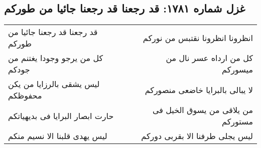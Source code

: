 \begin{center}
\section*{غزل شماره ۱۷۸۱: قد رجعنا قد رجعنا جائیا من طورکم}
\label{sec:1781}
\begin{longtable}{l p{0.5cm} r}
قد رجعنا قد رجعنا جائیا من طورکم
&&
انظرونا انظرونا نقتبس من نورکم
\\
کل من یرجو وجودا یغتنم من جودکم
&&
کل من ارداه عسر نال من میسورکم
\\
لیس یشقی بالرزایا من یکن محفوظکم
&&
لا یبالی بالبرایا خاضعی منصورکم
\\
حارت ابصار البرایا فی بدیهیاتکم
&&
من یلاقی من یسوق الخیل فی مستورکم
\\
لیس یهدی قلبنا الا نسیم منکم
&&
لیس یجلی طرفنا الا بقربی دورکم
\\
\end{longtable}
\end{center}
